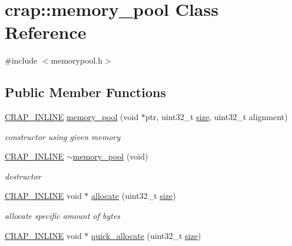 \hypertarget{classcrap_1_1memory__pool}{}\section{crap\+:\+:memory\+\_\+pool Class Reference}
\label{classcrap_1_1memory__pool}


{\ttfamily \#include $<$memorypool.\+h$>$}

\subsection*{Public Member Functions}
\begin{DoxyCompactItemize}
\item 
\hyperlink{config__x86_8h_a5a40526b8d842e7ff731509998bb0f1c}{C\+R\+A\+P\+\_\+\+I\+N\+L\+I\+N\+E} \hyperlink{classcrap_1_1memory__pool_a9d8b04bac053bfd845f4619bfbc2ac64}{memory\+\_\+pool} (void $\ast$ptr, uint32\+\_\+t \hyperlink{classcrap_1_1memory__pool_a2f3e04e4e27dcdef3ded60f2ee7ee939}{size}, uint32\+\_\+t alignment)
\begin{DoxyCompactList}\small\item\em constructor using given memory \end{DoxyCompactList}\item 
\hyperlink{config__x86_8h_a5a40526b8d842e7ff731509998bb0f1c}{C\+R\+A\+P\+\_\+\+I\+N\+L\+I\+N\+E} \hyperlink{classcrap_1_1memory__pool_ac9c5827710ea2e286081ccf215de18c8}{$\sim$memory\+\_\+pool} (void)
\begin{DoxyCompactList}\small\item\em destructor \end{DoxyCompactList}\item 
\hyperlink{config__x86_8h_a5a40526b8d842e7ff731509998bb0f1c}{C\+R\+A\+P\+\_\+\+I\+N\+L\+I\+N\+E} void $\ast$ \hyperlink{classcrap_1_1memory__pool_afb562c0ca4a48a1d703fe12a870a772e}{allocate} (uint32\+\_\+t \hyperlink{classcrap_1_1memory__pool_a2f3e04e4e27dcdef3ded60f2ee7ee939}{size})
\begin{DoxyCompactList}\small\item\em allocate specific amount of bytes \end{DoxyCompactList}\item 
\hyperlink{config__x86_8h_a5a40526b8d842e7ff731509998bb0f1c}{C\+R\+A\+P\+\_\+\+I\+N\+L\+I\+N\+E} void $\ast$ \hyperlink{classcrap_1_1memory__pool_a5cabbef2d40ea3872bad37dcdf6ae0f1}{quick\+\_\+allocate} (uint32\+\_\+t \hyperlink{classcrap_1_1memory__pool_a2f3e04e4e27dcdef3ded60f2ee7ee939}{size})

\end{DoxyCompactItemize}
